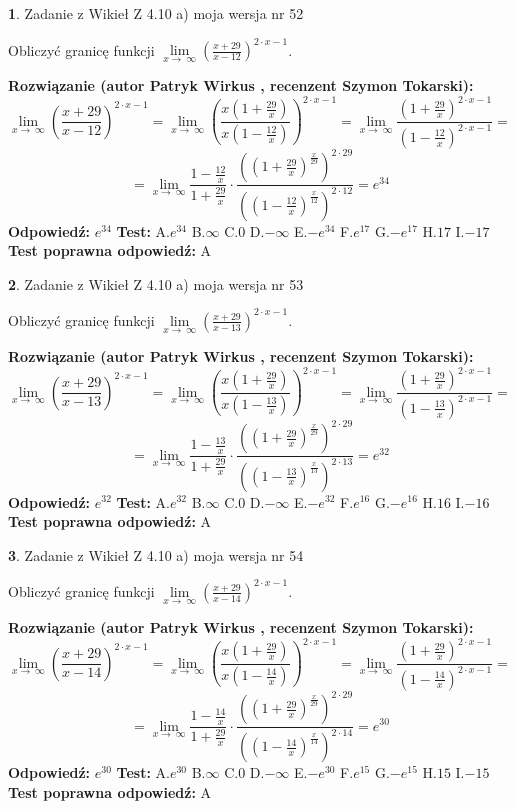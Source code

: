 \documentclass[12pt, a4paper]{article}
\theoremstyle{definition} %
\newtheorem{zad}{}
\newcommand{\zadStart}[1]{\begin{zad}#1\newline}
\newcommand{\zadStop}{\end{zad}}
\newcommand{\rozwStart}[2]{\noindent \textbf{Rozwiązanie (autor #1 , recenzent #2): }\newline}
\newcommand{\rozwStop}{\newline}
\newcommand{\odpStart}{\noindent \textbf{Odpowiedź:}\newline}
\newcommand{\odpStop}{\newline}
\newcommand{\testStart}{\noindent \textbf{Test:}\newline}
\newcommand{\testStop}{\newline}
\newcommand{\kluczStart}{\noindent \textbf{Test poprawna odpowiedź:}\newline}
\newcommand{\kluczStop}{\newline}
\begin{document}
\zadStart{Zadanie z Wikieł Z 4.10 a) moja wersja nr 52}

Obliczyć granicę funkcji  $\lim\limits_{x\to\ \infty}(\frac{x+29}{x-12})^{2\cdot x-1}$.
\zadStop
\rozwStart{Patryk Wirkus}{Szymon Tokarski}
$$\lim\limits_{x\to\ \infty}(\frac{x+29}{x-12})^{2\cdot x-1} = \lim\limits_{x\to\ \infty}(\frac{x(1+\frac{29}{x})}{x(1-\frac{12}{x})})^{2\cdot x-1}=\lim\limits_{x\to\ \infty}\frac{(1+\frac{29}{x})^{2\cdot x-1}}{(1-\frac{12}{x})^{2\cdot x-1}}=$$
$$=\lim\limits_{x\to\ \infty}\frac{1-\frac{12}{x}}{1+\frac{29}{x}}\cdot\frac{((1+\frac{29}{x})^{\frac{x}{29}})^{2\cdot29}}{((1-\frac{12}{x})^{\frac{x}{12}})^{2\cdot12}}=e^{34}$$
\rozwStop
\odpStart
$e^{34}$
\odpStop
\testStart
A.$e^{34}$ B.$\infty$ C.$0$ D.$-\infty$ E.$-e^{34}$
F.$e^{17}$ G.$-e^{17}$
H.$17$
I.$-17$
\testStop
\kluczStart
A
\kluczStop



\zadStart{Zadanie z Wikieł Z 4.10 a) moja wersja nr 53}

Obliczyć granicę funkcji  $\lim\limits_{x\to\ \infty}(\frac{x+29}{x-13})^{2\cdot x-1}$.
\zadStop
\rozwStart{Patryk Wirkus}{Szymon Tokarski}
$$\lim\limits_{x\to\ \infty}(\frac{x+29}{x-13})^{2\cdot x-1} = \lim\limits_{x\to\ \infty}(\frac{x(1+\frac{29}{x})}{x(1-\frac{13}{x})})^{2\cdot x-1}=\lim\limits_{x\to\ \infty}\frac{(1+\frac{29}{x})^{2\cdot x-1}}{(1-\frac{13}{x})^{2\cdot x-1}}=$$
$$=\lim\limits_{x\to\ \infty}\frac{1-\frac{13}{x}}{1+\frac{29}{x}}\cdot\frac{((1+\frac{29}{x})^{\frac{x}{29}})^{2\cdot29}}{((1-\frac{13}{x})^{\frac{x}{13}})^{2\cdot13}}=e^{32}$$
\rozwStop
\odpStart
$e^{32}$
\odpStop
\testStart
A.$e^{32}$ B.$\infty$ C.$0$ D.$-\infty$ E.$-e^{32}$
F.$e^{16}$ G.$-e^{16}$
H.$16$
I.$-16$
\testStop
\kluczStart
A
\kluczStop



\zadStart{Zadanie z Wikieł Z 4.10 a) moja wersja nr 54}

Obliczyć granicę funkcji  $\lim\limits_{x\to\ \infty}(\frac{x+29}{x-14})^{2\cdot x-1}$.
\zadStop
\rozwStart{Patryk Wirkus}{Szymon Tokarski}
$$\lim\limits_{x\to\ \infty}(\frac{x+29}{x-14})^{2\cdot x-1} = \lim\limits_{x\to\ \infty}(\frac{x(1+\frac{29}{x})}{x(1-\frac{14}{x})})^{2\cdot x-1}=\lim\limits_{x\to\ \infty}\frac{(1+\frac{29}{x})^{2\cdot x-1}}{(1-\frac{14}{x})^{2\cdot x-1}}=$$
$$=\lim\limits_{x\to\ \infty}\frac{1-\frac{14}{x}}{1+\frac{29}{x}}\cdot\frac{((1+\frac{29}{x})^{\frac{x}{29}})^{2\cdot29}}{((1-\frac{14}{x})^{\frac{x}{14}})^{2\cdot14}}=e^{30}$$
\rozwStop
\odpStart
$e^{30}$
\odpStop
\testStart
A.$e^{30}$ B.$\infty$ C.$0$ D.$-\infty$ E.$-e^{30}$
F.$e^{15}$ G.$-e^{15}$
H.$15$
I.$-15$
\testStop
\kluczStart
A
\kluczStop
\end{document}
